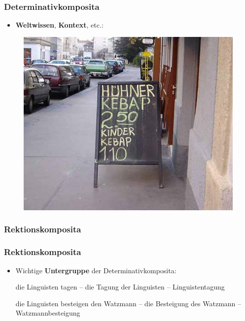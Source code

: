 \begin{frame}
\frametitle{Determinativkomposita}

\begin{itemize}
	\item \textbf{Weltwissen}, \textbf{Kontext}, etc.:
\end{itemize}

\begin{figure}
\centering
\includegraphics[scale=.55]{material/05Morph-Kebap}
\end{figure}

\end{frame}


\subsubsection{Rektionskomposita}


\begin{frame}
\frametitle{Rektionskomposita}

\begin{itemize}
	\item Wichtige \textbf{Untergruppe} der Determinativkomposita:
	
	\ea \label{ex:Bsp1} die Linguisten tagen – die Tagung der Linguisten – Linguistentagung
	\z
	
	\ea \label{ex:Bsp2} die Linguisten besteigen den Watzmann – die Besteigung des Watzmann – Watzmannbesteigung
	\z
		 
\end{itemize}


\end{frame}



